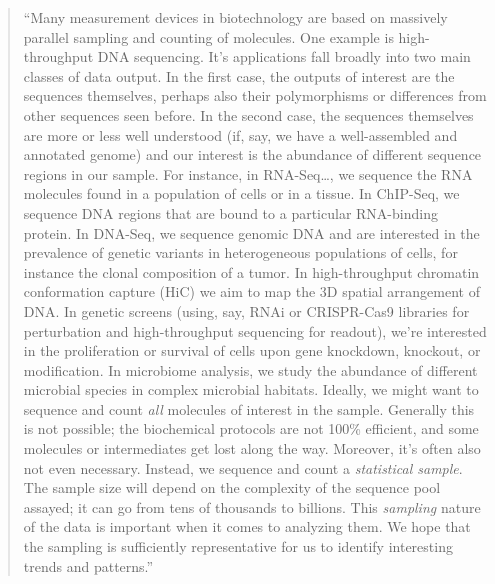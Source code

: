 \documentclass[]{tufte-book}
\begin{document}
\begin{quote}
``Many measurement devices in biotechnology are based on massively parallel
sampling and counting of molecules. One example is high-throughput DNA sequencing.
It's applications fall broadly into two main classes of data output. In the
first case, the outputs of interest are the sequences themselves, perhaps
also their polymorphisms or differences from other sequences seen before. In
the second case, the sequences themselves are more or less well understood
(if, say, we have a well-assembled and annotated genome) and our interest
is the abundance of different sequence regions in our sample. For instance,
in RNA-Seq\ldots, we sequence the RNA molecules found in a population of cells
or in a tissue. In ChIP-Seq, we sequence DNA regions that are bound to a particular
RNA-binding protein. In DNA-Seq, we sequence genomic DNA and are interested in
the prevalence of genetic variants in heterogeneous populations of cells, for
instance the clonal composition of a tumor. In high-throughput chromatin
conformation capture (HiC) we aim to map the 3D spatial arrangement of
DNA. In genetic screens (using, say, RNAi or CRISPR-Cas9 libraries for
perturbation and high-throughput sequencing for readout), we're interested
in the proliferation or survival of cells upon gene knockdown,
knockout, or modification. In microbiome analysis, we study the abundance of
different microbial species in complex microbial habitats. Ideally, we
might want to sequence and count \emph{all} molecules of interest in the sample.
Generally this is not possible; the biochemical protocols are not 100\%
efficient, and some molecules or intermediates get lost along the way.
Moreover, it's often also not even necessary. Instead, we sequence and
count a \emph{statistical sample}. The sample size will depend on the complexity of the
sequence pool assayed; it can go from tens of thousands to billions. This
\emph{sampling} nature of the data is important when it comes to analyzing
them. We hope that the sampling is sufficiently representative for us
to identify interesting trends and patterns.'' \citep{holmes2018modern}
\end{quote}
\end{document}
